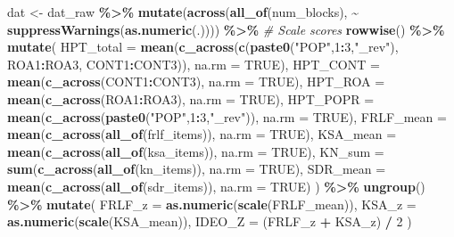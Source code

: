 \documentclass[
  10pt,
]{article}
\newenvironment{Shaded}{\begin{snugshade}}{\end{snugshade}}
\newcommand{\AttributeTok}[1]{\textcolor[rgb]{0.13,0.29,0.53}{#1}}
\newcommand{\CommentTok}[1]{\textcolor[rgb]{0.56,0.35,0.01}{\textit{#1}}}
\newcommand{\ConstantTok}[1]{\textcolor[rgb]{0.56,0.35,0.01}{#1}}
\newcommand{\DecValTok}[1]{\textcolor[rgb]{0.00,0.00,0.81}{#1}}
\newcommand{\FunctionTok}[1]{\textcolor[rgb]{0.13,0.29,0.53}{\textbf{#1}}}
\newcommand{\NormalTok}[1]{#1}
\newcommand{\OtherTok}[1]{\textcolor[rgb]{0.56,0.35,0.01}{#1}}
\newcommand{\SpecialCharTok}[1]{\textcolor[rgb]{0.81,0.36,0.00}{\textbf{#1}}}
\newcommand{\StringTok}[1]{\textcolor[rgb]{0.31,0.60,0.02}{#1}}
\begin{document}
\begin{Shaded}
\begin{Highlighting}[]
\NormalTok{dat }\OtherTok{\textless{}{-}}\NormalTok{ dat\_raw }\SpecialCharTok{\%\textgreater{}\%}
  \FunctionTok{mutate}\NormalTok{(}\FunctionTok{across}\NormalTok{(}\FunctionTok{all\_of}\NormalTok{(num\_blocks), }\SpecialCharTok{\textasciitilde{}} \FunctionTok{suppressWarnings}\NormalTok{(}\FunctionTok{as.numeric}\NormalTok{(.)))) }\SpecialCharTok{\%\textgreater{}\%}
  \CommentTok{\# Scale scores}
  \FunctionTok{rowwise}\NormalTok{() }\SpecialCharTok{\%\textgreater{}\%}
  \FunctionTok{mutate}\NormalTok{(}
    \AttributeTok{HPT\_total =} \FunctionTok{mean}\NormalTok{(}\FunctionTok{c\_across}\NormalTok{(}\FunctionTok{c}\NormalTok{(}\FunctionTok{paste0}\NormalTok{(}\StringTok{"POP"}\NormalTok{,}\DecValTok{1}\SpecialCharTok{:}\DecValTok{3}\NormalTok{,}\StringTok{"\_rev"}\NormalTok{), ROA1}\SpecialCharTok{:}\NormalTok{ROA3, CONT1}\SpecialCharTok{:}\NormalTok{CONT3)), }\AttributeTok{na.rm =} \ConstantTok{TRUE}\NormalTok{),}
    \AttributeTok{HPT\_CONT  =} \FunctionTok{mean}\NormalTok{(}\FunctionTok{c\_across}\NormalTok{(CONT1}\SpecialCharTok{:}\NormalTok{CONT3), }\AttributeTok{na.rm =} \ConstantTok{TRUE}\NormalTok{),}
    \AttributeTok{HPT\_ROA   =} \FunctionTok{mean}\NormalTok{(}\FunctionTok{c\_across}\NormalTok{(ROA1}\SpecialCharTok{:}\NormalTok{ROA3), }\AttributeTok{na.rm =} \ConstantTok{TRUE}\NormalTok{),}
    \AttributeTok{HPT\_POPR  =} \FunctionTok{mean}\NormalTok{(}\FunctionTok{c\_across}\NormalTok{(}\FunctionTok{paste0}\NormalTok{(}\StringTok{"POP"}\NormalTok{,}\DecValTok{1}\SpecialCharTok{:}\DecValTok{3}\NormalTok{,}\StringTok{"\_rev"}\NormalTok{)), }\AttributeTok{na.rm =} \ConstantTok{TRUE}\NormalTok{),}
    \AttributeTok{FRLF\_mean =} \FunctionTok{mean}\NormalTok{(}\FunctionTok{c\_across}\NormalTok{(}\FunctionTok{all\_of}\NormalTok{(frlf\_items)), }\AttributeTok{na.rm =} \ConstantTok{TRUE}\NormalTok{),}
    \AttributeTok{KSA\_mean  =} \FunctionTok{mean}\NormalTok{(}\FunctionTok{c\_across}\NormalTok{(}\FunctionTok{all\_of}\NormalTok{(ksa\_items)),  }\AttributeTok{na.rm =} \ConstantTok{TRUE}\NormalTok{),}
    \AttributeTok{KN\_sum    =} \FunctionTok{sum}\NormalTok{(}\FunctionTok{c\_across}\NormalTok{(}\FunctionTok{all\_of}\NormalTok{(kn\_items)),    }\AttributeTok{na.rm =} \ConstantTok{TRUE}\NormalTok{),}
    \AttributeTok{SDR\_mean  =} \FunctionTok{mean}\NormalTok{(}\FunctionTok{c\_across}\NormalTok{(}\FunctionTok{all\_of}\NormalTok{(sdr\_items)),  }\AttributeTok{na.rm =} \ConstantTok{TRUE}\NormalTok{)}
\NormalTok{  ) }\SpecialCharTok{\%\textgreater{}\%}
  \FunctionTok{ungroup}\NormalTok{() }\SpecialCharTok{\%\textgreater{}\%}
  \FunctionTok{mutate}\NormalTok{(}
    \AttributeTok{FRLF\_z =} \FunctionTok{as.numeric}\NormalTok{(}\FunctionTok{scale}\NormalTok{(FRLF\_mean)),}
    \AttributeTok{KSA\_z  =} \FunctionTok{as.numeric}\NormalTok{(}\FunctionTok{scale}\NormalTok{(KSA\_mean)),}
    \AttributeTok{IDEO\_Z =}\NormalTok{ (FRLF\_z }\SpecialCharTok{+}\NormalTok{ KSA\_z) }\SpecialCharTok{/} \DecValTok{2}
\NormalTok{  )}


\end{Highlighting}
\end{Shaded}
\end{document}

